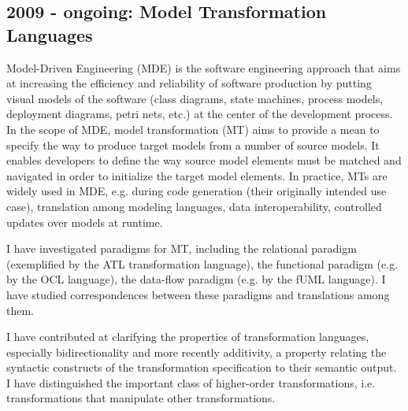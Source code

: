 \documentclass[10pt,a4paper]{article}
\begin{document}
\subsection{2009 - ongoing: Model Transformation Languages}

Model-Driven Engineering (MDE) is the software engineering approach that aims at increasing the efficiency and reliability of software production by putting visual models of the software (class diagrams, state machines, process models, deployment diagrams, petri nets, etc.) at the center of the development process. 
In the scope of MDE, model transformation (MT) aims to provide a mean to specify the way to produce target models from a number of source models. It enables developers to define the way source model elements must be matched and navigated in order to initialize the target model elements. %
In practice, MTs are widely used in MDE, e.g. during code generation (their originally intended use case), translation among modeling languages, data interoperability, controlled updates over models at runtime.

I have investigated paradigms for MT, including the relational paradigm (exemplified by the ATL transformation language), the functional paradigm (e.g. by the OCL language), the data-flow paradigm (e.g. by the fUML language). I have studied correspondences between these paradigms and translations among them. 

I have contributed at clarifying the properties of transformation languages, especially bidirectionality and more recently additivity, a property relating the syntactic constructs of the transformation specification to their semantic output. I have distinguished the important class of higher-order transformations, i.e. transformations that manipulate other transformations.
\end{document}
